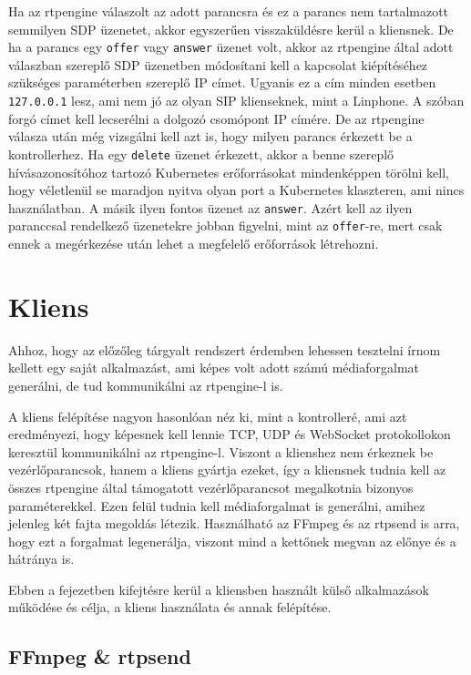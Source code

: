 Ha az rtpengine válaszolt az adott parancsra és ez a parancs nem tartalmazott semmilyen 
SDP üzenetet, akkor egyszerűen visszaküldésre kerül a kliensnek. De ha a parancs egy 
\texttt{offer} vagy \texttt{answer} üzenet volt, akkor az rtpengine által adott válaszban 
szereplő SDP üzenetben módosítani kell a kapcsolat kiépítéséhez szükséges paraméterben 
szereplő IP címet. Ugyanis ez a cím minden esetben \texttt{127.0.0.1} lesz, ami nem jó az 
olyan SIP klienseknek, mint a Linphone. A szóban forgó címet kell lecserélni a dolgozó 
csomópont IP címére. De az rtpengine válasza után még vizsgálni kell azt is, hogy milyen 
parancs érkezett be a kontrollerhez. Ha egy \texttt{delete} üzenet érkezett, akkor a 
benne szereplő hívásazonosítóhoz tartozó Kubernetes erőforrásokat mindenképpen törölni 
kell, hogy véletlenül se maradjon nyitva olyan port a Kubernetes klaszteren, ami nincs 
használatban. A másik ilyen fontos üzenet az \texttt{answer}. Azért kell az ilyen 
paranccsal rendelkező üzenetekre jobban figyelni, mint az \texttt{offer}-re, mert csak 
ennek a megérkezése után lehet a megfelelő erőforrások létrehozni.

\section{Kliens}

Ahhoz, hogy az előzőleg tárgyalt rendszert érdemben lehessen tesztelni írnom kellett egy 
saját alkalmazást, ami képes volt adott számú médiaforgalmat generálni, de tud 
kommunikálni az rtpengine-l is.

A kliens felépítése nagyon hasonlóan néz ki, mint a kontrolleré, ami azt eredményezi, 
hogy képesnek kell lennie  TCP, UDP és WebSocket protokollokon keresztül kommunikálni az 
rtpengine-l. Viszont a klienshez nem érkeznek be vezérlőparancsok, hanem a kliens gyártja 
ezeket, így a kliensnek tudnia kell az összes rtpengine által támogatott vezérlőparancsot 
megalkotnia bizonyos paraméterekkel. Ezen felül tudnia kell médiaforgalmat is generálni, 
amihez jelenleg két fajta megoldás létezik. Használható az FFmpeg és az rtpsend is arra, 
hogy ezt a forgalmat legenerálja, viszont mind a kettőnek megvan az előnye és a hátránya 
is. 

Ebben a fejezetben kifejtésre kerül a kliensben használt külső alkalmazások működése és 
célja, a kliens használata és annak felépítése. 

\subsection{FFmpeg \& rtpsend}

